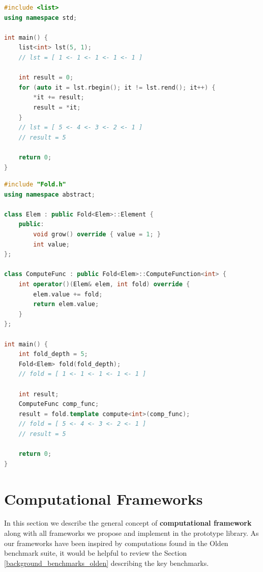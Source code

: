 \begin{lstlisting}[caption={Left fold computation using standard STL list class template},label={lst:left_fold_list},language=C++]
#include <list>
using namespace std;

int main() {
    list<int> lst(5, 1);
    // lst = [ 1 <- 1 <- 1 <- 1 <- 1 ]
    
    int result = 0;
    for (auto it = lst.rbegin(); it != lst.rend(); it++) {
        *it += result;
        result = *it;
    }
    // lst = [ 5 <- 4 <- 3 <- 2 <- 1 ]
    // result = 5
    
    return 0;
}
\end{lstlisting}

\begin{lstlisting}[caption={Left fold computation using our Fold computational framework},label={lst:left_fold_framework},language=C++]
#include "Fold.h"
using namespace abstract;

class Elem : public Fold<Elem>::Element {
    public:
        void grow() override { value = 1; }
        int value;
};

class ComputeFunc : public Fold<Elem>::ComputeFunction<int> {
    int operator()(Elem& elem, int fold) override {
        elem.value += fold;
        return elem.value;
    }
};

int main() {
    int fold_depth = 5;
    Fold<Elem> fold(fold_depth);
    // fold = [ 1 <- 1 <- 1 <- 1 <- 1 ]
    
    int result;
    ComputeFunc comp_func;
    result = fold.template compute<int>(comp_func);
    // fold = [ 5 <- 4 <- 3 <- 2 <- 1 ]
    // result = 5
    
    return 0;
}
\end{lstlisting}

\section{Computational Frameworks}
\label{frameworks_main}
\quad In this section we describe the general concept of \textbf{computational framework} along with all frameworks we propose and implement in the prototype library. As our frameworks have been inspired by computations found in the Olden benchmark suite, it would be helpful to review the Section \ref{background_benchmarks_olden} describing the key benchmarks.
